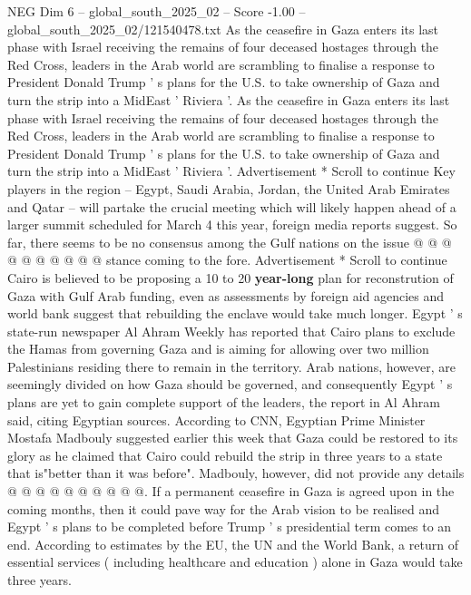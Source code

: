 \begin{textsample}{NEG Dim 6 – global\_south\_2025\_02 – Score -1.00 – global\_south\_2025\_02/121540478.txt}  \label{ex:f6_neg_047}
As the ceasefire in Gaza enters its last phase with Israel receiving the remains of four deceased hostages through the Red Cross, leaders in the Arab world are scrambling to finalise a response to President Donald Trump ' s plans for the U.S. to take ownership of Gaza and turn the strip into a MidEast ' Riviera '.
As the ceasefire in Gaza enters its last phase with Israel receiving the remains of four deceased hostages through the Red Cross, leaders in the Arab world are scrambling to finalise a response to President Donald Trump ' s plans for the U.S. to take ownership of Gaza and turn the strip into a MidEast ' Riviera '.
Advertisement * Scroll to continue Key players in the region -- Egypt, Saudi Arabia, Jordan, the United Arab Emirates and Qatar -- will partake the crucial meeting which will likely happen ahead of a larger summit scheduled for March 4 this year, foreign media reports suggest.
So far, there seems to be no consensus among the Gulf nations on the issue @ @ @ @ @ @ @ @ @ @ stance coming to the fore.
Advertisement * Scroll to continue Cairo is believed to be proposing a 10 to 20 \textbf{year-long} plan for reconstrution of Gaza with Gulf Arab funding, even as assessments by foreign aid agencies and world bank suggest that rebuilding the enclave would take much longer.
Egypt ' s state-run newspaper Al Ahram Weekly has reported that Cairo plans to exclude the Hamas from governing Gaza and is aiming for allowing over two million Palestinians residing there to remain in the territory.
Arab nations, however, are seemingly divided on how Gaza should be governed, and consequently Egypt ' s plans are yet to gain complete support of the leaders, the report in Al Ahram said, citing Egyptian sources.
According to CNN, Egyptian Prime Minister Mostafa Madbouly suggested earlier this week that Gaza could be restored to its glory as he claimed that Cairo could rebuild the strip in three years to a state that is"better than it was before".
Madbouly, however, did not provide any details @ @ @ @ @ @ @ @ @ @.
If a permanent ceasefire in Gaza is agreed upon in the coming months, then it could pave way for the Arab vision to be realised and Egypt ' s plans to be completed before Trump ' s presidential term comes to an end.
According to estimates by the EU, the UN and the World Bank, a return of essential services ( including healthcare and education ) alone in Gaza would take three years.

\end{textsample}
